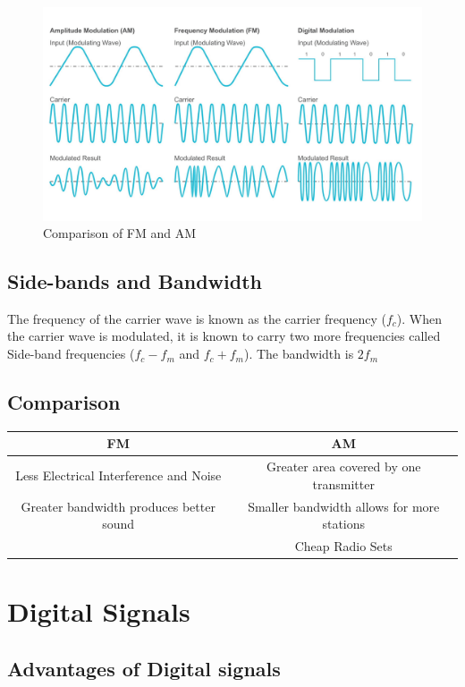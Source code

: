 \documentclass{scrbook}
\begin{document}
	\begin{figure}[t]
		\caption{Comparison of FM and AM \cite{taitra}}
		\label{fmamcomp}
		\includegraphics[width=\linewidth]{assets/fmam.png}
	\end{figure}

\subsection{Side-bands and Bandwidth}

	The frequency of the carrier wave is known as the carrier frequency ($f_c$). When the carrier wave is modulated, it is known to carry two more frequencies called Side-band frequencies ($f_c - f_m$ and $f_c + f_m$). The bandwidth is $2f_m$

\subsection{Comparison}

	\begin{tabular}{| c | c |}
		\hline
		FM & AM \\
		\hline 
		Less Electrical Interference and Noise & Greater area covered by one transmitter \\ 
		Greater bandwidth produces better sound & Smaller bandwidth allows for more stations \\ 
		& Cheap Radio Sets \\
		\hline
	\end{tabular}

\section{Digital Signals}

\subsection{Advantages of Digital signals}
\end{document}
